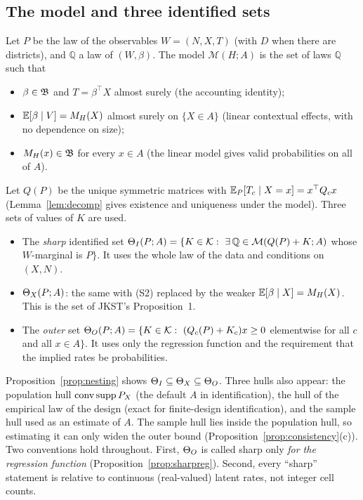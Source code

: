 \subsection{The model and three identified sets}

Let $P$ be the law of the observables $W=(N,X,T)$ (with $D$ when there are
districts), and $\mathbb Q$ a law of $(W,\beta)$. The model $\mathcal M(H;A)$ is the
set of laws $\mathbb Q$ such that
\begin{itemize}
\item[(S1)] $\beta\in\mathfrak B$ and $T=\beta^\top X$ almost surely (the accounting identity);
\item[(S2)] $\mathbb E[\beta\mid V]=M_H(X)$ almost surely on $\{X\in A\}$ (linear contextual
effects, with no dependence on size);
\item[(S3)] $M_H(x)\in\mathfrak B$ for every $x\in A$ (the linear model gives valid
probabilities on all of $A$).
\end{itemize}
Let $Q(P)$ be the unique symmetric matrices with $\mathbb E_P[T_c\mid X=x]=x^\top Q_cx$
(Lemma~\ref{lem:decomp} gives existence and uniqueness under the model). Three
sets of values of $K$ are used.
\begin{itemize}
\item The \emph{sharp} identified set
$\Theta_I(P;A)=\{K\in\mathcal K:\ \exists\,\mathbb Q\in\mathcal M(Q(P)+K;A)$ whose
$W$-marginal is $P\}$. It uses the whole law of the data and conditions on
$(X,N)$.
\item $\Theta_X(P;A)$: the same with (S2) replaced by the weaker
$\mathbb E[\beta\mid X]=M_H(X)$. This is the set of JKST's Proposition~1.
\item The \emph{outer} set
$\Theta_O(P;A)=\{K\in\mathcal K:\ (Q_c(P)+K_c)x\ge0$ elementwise for all $c$ and all
$x\in A\}$. It uses only the regression function and the requirement that the
implied rates be probabilities.
\end{itemize}
Proposition~\ref{prop:nesting} shows $\Theta_I\subseteq\Theta_X\subseteq\Theta_O$. Three
hulls also appear: the population hull $\operatorname{conv}\operatorname{supp} P_X$ (the default $A$ in
identification), the hull of the empirical law of the design (exact for
finite-design identification), and the sample hull used as an estimate of $A$.
The sample hull lies inside the population hull, so estimating it can only widen
the outer bound (Proposition~\ref{prop:consistency}(c)). Two conventions hold
throughout. First, $\Theta_O$ is called sharp only \emph{for the regression function}
(Proposition~\ref{prop:sharpreg}). Second, every ``sharp'' statement is relative
to continuous (real-valued) latent rates, not integer cell counts.

